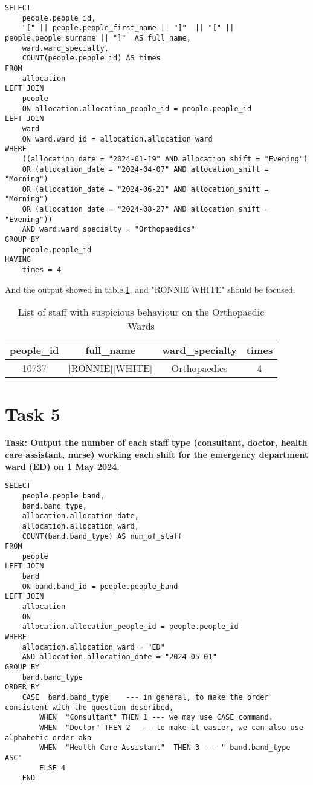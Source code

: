 \documentclass{article}
\begin{document}
\begin{lstlisting}[style=sqlstyle]
SELECT 
    people.people_id,
    "[" || people.people_first_name || "]"  || "[" || people.people_surname || "]"  AS full_name,
    ward.ward_specialty,
    COUNT(people.people_id) AS times
FROM
    allocation
LEFT JOIN
    people
    ON allocation.allocation_people_id = people.people_id
LEFT JOIN
    ward
    ON ward.ward_id = allocation.allocation_ward
WHERE 
    ((allocation_date = "2024-01-19" AND allocation_shift = "Evening") 
    OR (allocation_date = "2024-04-07" AND allocation_shift = "Morning")
    OR (allocation_date = "2024-06-21" AND allocation_shift = "Morning")
    OR (allocation_date = "2024-08-27" AND allocation_shift = "Evening")) 
    AND ward.ward_specialty = "Orthopaedics"
GROUP BY
    people.people_id
HAVING
    times = 4

\end{lstlisting}

And the output showed in table.\ref{tab:task4}, and "RONNIE WHITE" should be focused.
\begin{table}[h]
    \centering
\begin{tabular}{|c|c|c|c|}
\hline people\_id & full\_name & ward\_specialty & times \\
\hline 10737 & [RONNIE][WHITE] & Orthopaedics & 4 \\
\hline
\end{tabular}
    \caption{List of staff with suspicious behaviour on the Orthopaedic Wards}
    \label{tab:task4}
\end{table}

\section{Task 5}

\textbf{Task: Output the number of each staff type (consultant, doctor, health care assistant, nurse) working each shift for the emergency department ward (ED) on 1 May 2024.}

\begin{lstlisting}[style=sqlstyle]
SELECT 
    people.people_band,
    band.band_type,
    allocation.allocation_date,
    allocation.allocation_ward,
    COUNT(band.band_type) AS num_of_staff
FROM
    people
LEFT JOIN
    band
    ON band.band_id = people.people_band
LEFT JOIN
    allocation
    ON
    allocation.allocation_people_id = people.people_id
WHERE
    allocation.allocation_ward = "ED"
    AND allocation.allocation_date = "2024-05-01"
GROUP BY
    band.band_type
ORDER BY
    CASE  band.band_type    --- in general, to make the order consistent with the question described, 
        WHEN  "Consultant" THEN 1 --- we may use CASE command.
        WHEN  "Doctor" THEN 2  --- to make it easier, we can also use alphabetic order aka
        WHEN  "Health Care Assistant"  THEN 3 --- " band.band_type  ASC"
        ELSE 4
    END
\end{lstlisting}
\end{document}
